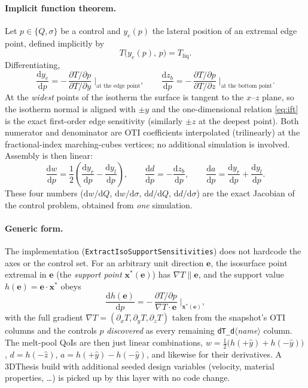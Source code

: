 \documentclass[11pt]{article}
\newcommand{\dd}{\mathrm{d}}
\begin{document}
\paragraph{Implicit function theorem.} Let $p \in \{Q, \sigma\}$ be a control
and $y_e(p)$ the lateral position of an extremal edge point, defined
implicitly by
\begin{equation}
  T\bigl(y_e(p),\, p\bigr) = T_{\mathrm{liq}} .
\end{equation}
Differentiating,
\begin{equation}
  \frac{\dd y_e}{\dd p}
  = -\,\frac{\partial T/\partial p}{\partial T/\partial y}
  \;\Bigg|_{\text{at the edge point}} ,
  \qquad
  \frac{\dd z_b}{\dd p}
  = -\,\frac{\partial T/\partial p}{\partial T/\partial z}
  \;\Bigg|_{\text{at the bottom point}} .
  \label{eq:ift}
\end{equation}
At the \emph{widest} points of the isotherm the surface is tangent to the
$x$--$z$ plane, so the isotherm normal is aligned with $\pm y$ and the
one-dimensional relation \eqref{eq:ift} is the exact first-order edge
sensitivity (similarly $\pm z$ at the deepest point). Both numerator and
denominator are OTI coefficients interpolated (trilinearly) at the
fractional-index marching-cubes vertices; no additional simulation is
involved. Assembly is then linear:
\begin{equation}
  \frac{\dd w}{\dd p} = \frac12\!\left(\frac{\dd y_r}{\dd p}-\frac{\dd y_l}{\dd p}\right),
  \qquad
  \frac{\dd d}{\dd p} = -\frac{\dd z_b}{\dd p},
  \qquad
  \frac{\dd a}{\dd p} = \frac{\dd y_r}{\dd p}+\frac{\dd y_l}{\dd p}.
\end{equation}
These four numbers ($\dd w/\dd Q$, $\dd w/\dd\sigma$, $\dd d/\dd Q$,
$\dd d/\dd\sigma$) are the exact Jacobian of the control problem, obtained
from \emph{one} simulation.

\paragraph{Generic form.} The implementation
(\texttt{ExtractIsoSupportSensitivities}) does not hardcode the axes or the
control set. For an arbitrary unit direction $\mathbf e$, the isosurface
point extremal in $\mathbf e$ (the \emph{support point} $\mathbf x^\ast(\mathbf e)$)
has $\nabla T \parallel \mathbf e$, and the support value
$h(\mathbf e) = \mathbf e\cdot\mathbf x^\ast$ obeys
\begin{equation}
  \frac{\dd h(\mathbf e)}{\dd p}
  = -\,\frac{\partial T/\partial p}{\nabla T\cdot\mathbf e}
  \;\Bigg|_{\mathbf x^\ast(\mathbf e)},
  \label{eq:support}
\end{equation}
with the full gradient $\nabla T = (\partial_x T, \partial_y T, \partial_z T)$
taken from the snapshot's OTI columns and the controls $p$ \emph{discovered}
as every remaining \texttt{dT\_d}$\langle$\emph{name}$\rangle$ column. The
melt-pool QoIs are then just linear combinations,
$w = \tfrac12\bigl(h(+\hat y) + h(-\hat y)\bigr)$, $d = h(-\hat z)$,
$a = h(+\hat y) - h(-\hat y)$, and likewise for their derivatives. A 3DThesis
build with additional seeded design variables (velocity, material
properties, \ldots) is picked up by this layer with no code change.
\end{document}
